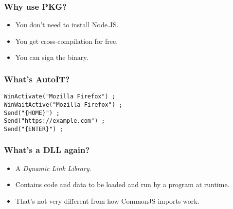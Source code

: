 \begin{frame}
	\frametitle{Why use PKG?}

	\Large
	\begin{itemize}
		\item You don’t need to install Node.JS.
		\item You get cross-compilation for free.
		\item You can sign the binary.
	\end{itemize}
\end{frame}

% 

\begin{frame}[fragile]
	\frametitle{What’s AutoIT?}

	\Large
	\begin{verbatim}
WinActivate("Mozilla Firefox") ;
WinWaitActive("Mozilla Firefox") ;
Send("{HOME}") ;
Send("https://example.com") ;
Send("{ENTER}") ;
	\end{verbatim}
\end{frame}

\begin{frame}
	\frametitle{What’s a DLL again?}

	\Large
	\begin{itemize}
		\item A {\em Dynamic Link Library}.
		\item Contains code and data to be loaded and run by a program at runtime.
		\item That’s not very different from how CommonJS imports work.
	\end{itemize}
\end{frame}


